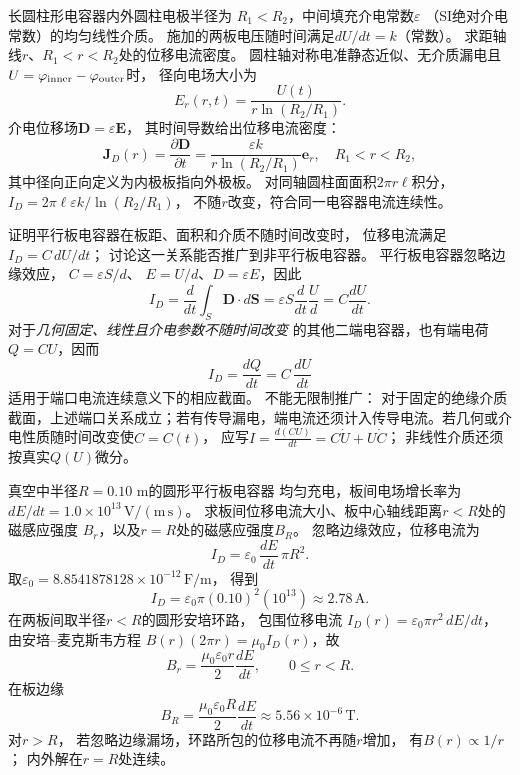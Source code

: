 \problemtext 长圆柱形电容器内外圆柱电极半径为
$R_1<R_2$，中间填充介电常数$\varepsilon$
（SI绝对介电常数）的均匀线性介质。
施加的两板电压随时间满足$dU/dt=k$（常数）。
求距轴线$r$、$R_1<r<R_2$处的位移电流密度。
\workings
圆柱轴对称电准静态近似、无介质漏电且$U=\varphi_{\rm inner}-\varphi_{\rm outer}$时，
径向电场大小为
\[
E_r(r,t)=\frac{U(t)}{r\ln(R_2/R_1)}.
\]
介电位移场$\bm D=\varepsilon\bm E$，
其时间导数给出位移电流密度：
\[
\boxed{\bm J_D(r)=\frac{\partial\bm D}{\partial t}
=\frac{\varepsilon k}{r\ln(R_2/R_1)}\bm e_r},
\quad R_1<r<R_2,
\]
其中径向正向定义为内极板指向外极板。
\crosscheck 对同轴圆柱面面积$2\pi r\ell$积分，
$I_D=2\pi\ell\varepsilon k/\ln(R_2/R_1)$，
不随$r$改变，符合同一电容器电流连续性。

\problemtext 证明平行板电容器在板距、面积和介质不随时间改变时，
位移电流满足$I_D=C\,dU/dt$；
讨论这一关系能否推广到非平行板电容器。
\workings
平行板电容器忽略边缘效应，
$C=\varepsilon S/d$、
$E=U/d$、$D=\varepsilon E$，因此
\[
I_D=\frac d{dt}\int_S\bm D\cdot d\bm S
=\varepsilon S\frac{d}{dt}\frac Ud
=\boxed{C\frac{dU}{dt}}.
\]
对于\emph{几何固定、线性且介电参数不随时间改变}
的其他二端电容器，也有端电荷$Q=CU$，因而
\[
\boxed{I_D=\frac{dQ}{dt}=C\,\frac{dU}{dt}}
\]
适用于端口电流连续意义下的相应截面。
\crosscheck 不能无限制推广：
对于固定的绝缘介质截面，上述端口关系成立；若有传导漏电，端电流还须计入传导电流。若几何或介电性质随时间改变使$C=C(t)$，
应写$I=\frac{d(CU)}{dt}=C\dot U+U\dot C$；
非线性介质还须按真实$Q(U)$微分。

\problemtext 真空中半径$R=0.10$ m的圆形平行板电容器
均匀充电，板间电场增长率为
$dE/dt=1.0\times10^{13}\,\mathrm{V/(m\,s)}$。
求板间位移电流大小、板中心轴线距离$r<R$处的磁感应强度
$B_r$，以及$r=R$处的磁感应强度$B_R$。
\workings
忽略边缘效应，位移电流为
\[
I_D=\varepsilon_0\,\frac{dE}{dt}\,\pi R^2.
\]
取$\varepsilon_0=8.8541878128\times10^{-12}\,\mathrm{F/m}$，
得到
\[
\boxed{I_D=
\varepsilon_0\pi(0.10)^2(10^{13})
\approx2.78\,\mathrm A}.
\]
在两板间取半径$r<R$的圆形安培环路，
包围位移电流
$I_D(r)=\varepsilon_0\pi r^2\,dE/dt$，
由安培--麦克斯韦方程
$B(r)(2\pi r)=\mu_0I_D(r)$，故
\[
\boxed{B_r=\frac{\mu_0\varepsilon_0r}{2}
\frac{dE}{dt}},\qquad 0\le r<R.
\]
在板边缘
\[
\boxed{B_R=\frac{\mu_0\varepsilon_0R}{2}
\frac{dE}{dt}
\approx5.56\times10^{-6}\,\mathrm T}.
\]
\crosscheck 对$r>R$，
若忽略边缘漏场，环路所包的位移电流不再随$r$增加，
有$B(r)\propto1/r$；
内外解在$r=R$处连续。
